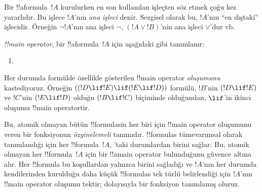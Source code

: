 \documentclass[../../../include/open-logic-section]{subfiles}
\begin{document}


\begin{explain}
Bir !!a{formula}~$!A$ kurulurken en son kullanılan işleçten söz etmek
çoğu kez yararlıdır. Bu işlece $!A$'nın \emph{ana işleci} denir.
Sezgisel olarak bu, $!A$'nın ``en dıştaki'' işlecidir. Örneğin
$\lnot !A$'nın ana işleci $\lnot$, $(!A \lor !B)$'nin ana işleci
$\lor$'dur vb.
\end{explain}


\begin{defn}
\emph{!!{main operator}}, bir !!a{formula}~$!A$ için aşağıdaki gibi
tanımlanır:
\begin{enumerate}
\item {}







\end{enumerate}
\end{defn}

Her durumda formülde özellikle gösterilen !!{main operator}
\emph{oluşumunu} kastediyoruz. Örneğin $((!D \lif !E) \lif (!E \lif
!D))$ formülü, $!B$'nin $(!D \lif !E)$ ve $!C$'nin $(!E \lif !D)$
olduğu $(!B \lif !C)$ biçiminde olduğundan, $\lif$'in ikinci oluşumu
!!{main operator}{}tir.

\begin{explain}
Bu, atomik olmayan bütün !!{formula}s{}in her biri için !!{main operator}
oluşumunu veren bir fonksiyonun \emph{özyinelemeli} tanımıdır.
!!{formula}s tümevarımsal olarak tanımlandığı için her
!!{formula}~$!A$, 'taki durumlardan birini sağlar.
Bu, atomik olmayan her !!{formula}~$!A$ için bir !!a{main
  operator} bulunduğunu güvence altına alır. Her !!{formula} bu
koşullardan yalnızca birini sağladığı ve $!A$'nın her durumda kendilerinden
kurulduğu daha küçük !!{formula}s tek türlü belirlendiği için $!A$'nın
!!{main
  operator} oluşumu tektir; dolayısıyla bir fonksiyon tanımlamış oluruz.
\end{explain}
\end{document}
